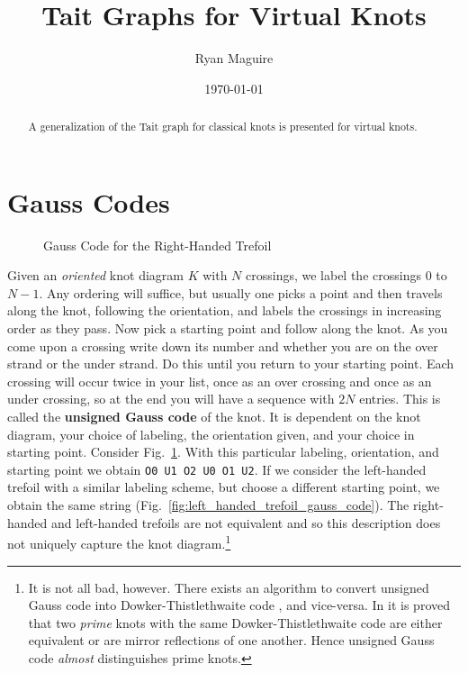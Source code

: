 \documentclass{article}
\title{Tait Graphs for Virtual Knots}
\author{Ryan Maguire}
\date{\today}
\theoremstyle{plain}
\begin{document}
    \maketitle
    \tableofcontents
    \begin{abstract}
        A generalization of the Tait graph for classical knots is presented
        for virtual knots.
    \end{abstract}
    \section{Gauss Codes}
        \begin{figure}
            \centering
            \caption{Gauss Code for the Right-Handed Trefoil}
            \label{fig:right_handed_trefoil_gauss_code}
        \end{figure}
        Given an \textit{oriented} knot diagram $K$ with $N$ crossings, we
        label the crossings $0$ to $N-1$. Any ordering will suffice, but
        usually one picks a point and then travels along the knot, following
        the orientation, and labels the crossings in increasing order as they
        pass. Now pick a starting point and follow along the knot. As you
        come upon a crossing write down its number and whether you are on the
        over strand or the under strand. Do this until you return to your
        starting point. Each crossing will occur twice in your list, once as an
        over crossing and once as an under crossing, so at the end you will
        have a sequence with $2N$ entries. This is called the
        \textbf{unsigned Gauss code} of the knot. It is dependent on the
        knot diagram, your choice of labeling, the orientation given, and your
        choice in starting point. Consider
        Fig.~\ref{fig:right_handed_trefoil_gauss_code}. With this particular
        labeling, orientation, and starting point we obtain
        \texttt{O0 U1 O2 U0 O1 U2}. If we consider the left-handed trefoil with
        a similar labeling scheme, but choose a different starting point, we
        obtain the same string (Fig.~\ref{fig:left_handed_trefoil_gauss_code}).
        The right-handed and left-handed trefoils are
        not equivalent \cite[p.~200-204]{DehnGroupTheoryAndTopology} and so
        this description does not uniquely capture the knot diagram.\footnote{%
            It is not all bad, however. There exists an algorithm to
            convert unsigned Gauss code into Dowker-Thistlethwaite code
            \cite{KatlasDTCode}, and vice-versa. In
            \cite{DowkerThistlethwaiteDTCode} it is
            proved that two \textit{prime} knots with the same
            Dowker-Thistlethwaite code are either equivalent or are mirror
            reflections of one another. Hence unsigned Gauss code
            \textit{almost} distinguishes prime knots.
        }
\end{document}

